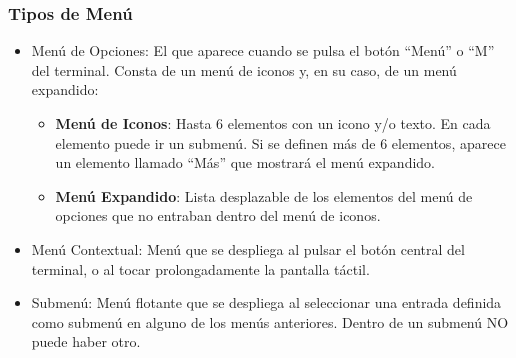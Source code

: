 \documentclass[hyperref={pdfpagelabels=true},ucs]{beamer}
\begin{document}
\begin{frame}
\frametitle{Tipos de Menú}



\begin{itemize}
\item \alert{Menú de Opciones}: El que aparece cuando se pulsa el
  botón ``Menú'' o ``M'' del terminal. Consta de un menú de iconos y,
  en su caso, de un menú expandido:
  \begin{itemize}
  \item \textbf{Menú de Iconos}: Hasta 6 elementos con un icono y/o
    texto.  En cada elemento puede ir un submenú. Si se definen más de
    6 elementos, aparece un elemento llamado ``Más'' que mostrará el
    menú expandido.
  \item \textbf{Menú Expandido}: Lista desplazable de los elementos del
    menú de opciones que no entraban dentro del menú de iconos.
  \end{itemize}
\item \alert{Menú Contextual}: Menú que se despliega al pulsar el
  botón central del terminal, o al tocar prolongadamente la pantalla
  táctil.
\item \alert{Submenú}: Menú flotante que se despliega al seleccionar
  una entrada definida como submenú en alguno de los menús
  anteriores. Dentro de un submenú NO puede haber otro.
\end{itemize}

\end{frame}
\end{document}
